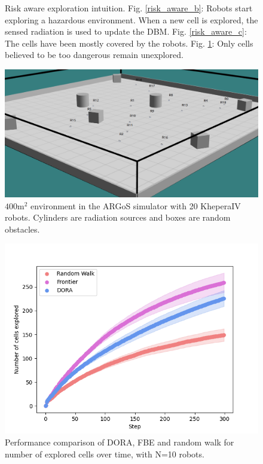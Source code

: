 \begin{figure}[h]
\begin{subfigure}{0.48\textwidth}
         \caption{}
         \label{risk_aware_d}
    \end{subfigure}
        \caption{Risk aware exploration intuition. Fig. \ref{risk_aware_b}: Robots start exploring a hazardous environment. When a new cell is explored, the sensed radiation is used to update the DBM. Fig. \ref{risk_aware_c}: The cells have been mostly covered by the robots. Fig. \ref{risk_aware_d}: Only cells believed to be too dangerous remain unexplored.}
    \label{risk_aware}
\end{figure}

\label{annexe: argos}

\begin{figure}[h]
	\centering
    \includegraphics[width=0.99\columnwidth]{images/argos.png}
    \caption{$400 \text{m}^2$ environment in the ARGoS simulator with 20 KheperaIV robots. Cylinders are radiation sources and boxes are random obstacles.}
    \label{argos}
\end{figure}

\label{annexe: results}

\begin{figure}[h]
	\centering
    \includegraphics[width=0.99\columnwidth]{images/explored_10.png}
    \caption{Performance comparison of DORA, FBE and random walk for number of explored cells over time, with N=10 robots.}
    \label{results:explored10}
\end{figure}

